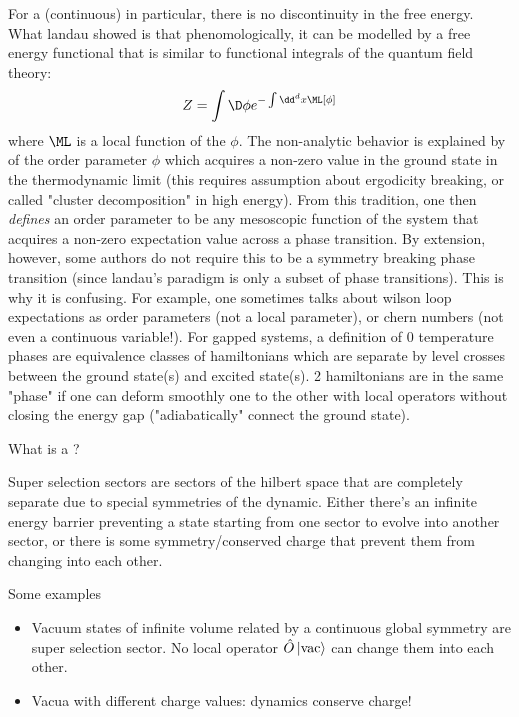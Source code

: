 \documentclass[11pt]{scrartcl}
\begin{document}
For a  (continuous) in particular, there is no discontinuity in the free energy.  What landau showed is that phenomologically, it can be modelled by a free energy functional that is similar to functional integrals of the quantum field theory:
\[ Z = \int \D \phi e^{- \int \dd^d x \ML [\phi]} \]
where $\ML$ is a local function of the  $\phi$. The non-analytic behavior is explained by  of the order parameter $\phi$ which acquires a non-zero value in the ground state in the thermodynamic limit (this requires assumption about ergodicity breaking, or called "cluster decomposition" in high energy).  From this tradition, one then \emph{defines} an order parameter to be any mesoscopic function of the system that acquires a non-zero expectation value across a phase transition.  By extension, however, some authors do not require this to be a symmetry breaking phase transition (since landau's paradigm is only a subset of phase transitions).  This is why it is confusing.  For example, one sometimes talks about wilson loop expectations as order parameters (not a local parameter), or chern numbers (not even a continuous variable!).
\newline
For gapped systems, a definition of 0 temperature phases are equivalence classes of hamiltonians which are separate by level crosses between the ground state(s) and excited state(s).  2 hamiltonians are in the same "phase" if one can deform smoothly one to the other with local operators without closing the energy gap ("adiabatically" connect the ground state).

\begin{myquestion}
	What is a ?
\end{myquestion}

Super selection sectors are sectors of the hilbert space that are completely separate due to special symmetries of the dynamic.  Either there's an infinite energy barrier preventing a state starting from one sector to evolve into another sector, or there is some symmetry/conserved charge that prevent them from changing into each other.

Some examples

\begin{itemize}
	\item Vacuum states of infinite volume  related by a continuous global symmetry are super selection sector.  No local operator $\hat{O} \ket{\text{vac}}$ can change them into each other.
	\item Vacua with different charge values: dynamics conserve charge!
\end{itemize}
\end{document}
